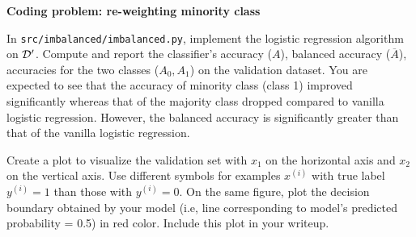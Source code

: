 \item {} \textbf{Coding problem: re-weighting minority class}

In \texttt{src/imbalanced/imbalanced.py}, implement the logistic regression algorithm on $\mathcal{D}'$.  Compute and report the classifier's accuracy ($A$), balanced accuracy ($\overline{A}$), accuracies for the two classes ($A_0, A_1$) on the validation dataset. You are expected to see that the accuracy of minority class (class 1) improved significantly whereas that of the majority class dropped compared to vanilla logistic regression. However, the balanced accuracy is significantly greater than that of the vanilla logistic regression. 


Create a plot to visualize the validation set with $x_1$ on the horizontal axis and $x_2$ on
the vertical axis. Use different symbols for examples $x^{(i)}$ with true label $y^{(i)} = 1$
than those with $y^{(i)} = 0$. On the same figure, plot the decision boundary obtained
by your model (i.e, line corresponding to model's predicted probability = 0.5) in red color. Include
this plot in your writeup.


